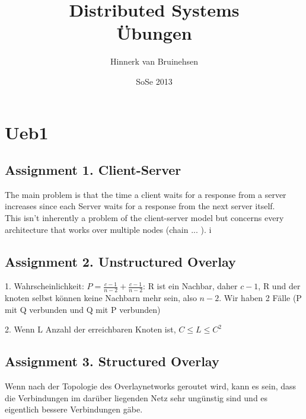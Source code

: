 \documentclass[ngerman,a4paper]{report}
\author{Hinnerk van Bruinehsen}
\title{Distributed Systems\\Übungen}
\date{SoSe 2013}
\renewcommand{\maketitle}{}
\begin{document}
\maketitle
\chapter{Ueb1}
\section*{Assignment 1. Client-Server}
The main problem is that the time a client waits for a response from a server increases since each Server waits for a response from the next server itself.\\
This isn't inherently a problem of the client-server model but concerns every architecture that works over multiple nodes (chain ... ).
i

\section*{Assignment 2. Unstructured Overlay}
1. Wahrscheinlichkeit: $P = \frac{c-1}{n-2}+\frac{c-1}{n-2}$: R ist ein Nachbar, daher $c-1$, R und der knoten selbst können keine Nachbarn mehr sein, also $n-2$. Wir haben 2 Fälle (P mit Q verbunden und Q mit P verbunden)

2. Wenn L Anzahl der erreichbaren Knoten ist, $C \leq L \leq C^2$  
\section*{Assignment 3. Structured Overlay}
Wenn nach der Topologie des Overlaynetworks geroutet wird, kann es sein, dass die Verbindungen im darüber liegenden Netz sehr ungünstig sind und es eigentlich bessere Verbindungen gäbe.
\end{document}
